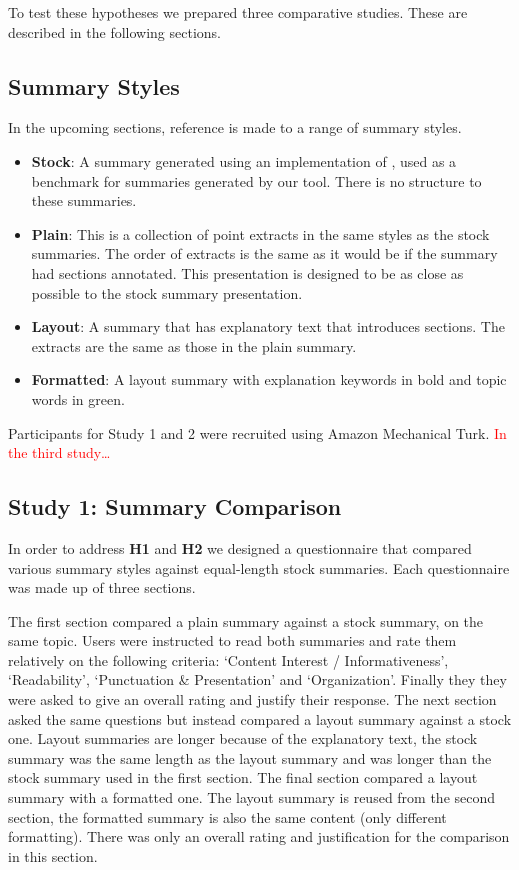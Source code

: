     To test these hypotheses we prepared three comparative studies. These are described in the following sections.

    \tocless\subsection{Summary Styles}
      In the upcoming sections, reference is made to a range of summary styles.
      \begin{itemize}
        \item{\textbf{Stock}: A summary generated using an implementation of \cite{nenkova2006compositional}, used as a benchmark for summaries generated by our tool. There is no structure to these summaries.}
        \item{\textbf{Plain}: This is a collection of point extracts in the same styles as the stock summaries. The order of extracts is the same as it would be if the summary had sections annotated. This presentation is designed to be as close as possible to the stock summary presentation.}
        \item{\textbf{Layout}: A summary that has explanatory text that introduces sections. The extracts are the same as those in the plain summary.}
        \item{\textbf{Formatted}: A layout summary with explanation keywords in bold and topic words in green.}
      \end{itemize}

      Participants for Study 1 and 2 were recruited using Amazon Mechanical Turk. \textcolor{red}{In the third study\dots}

    \tocless\subsection{Study 1: Summary Comparison}
      In order to address \textbf{H1} and \textbf{H2} we designed a questionnaire that compared various summary styles against equal-length stock summaries. Each questionnaire was made up of three sections.

      The first section compared a plain summary against a stock summary, on the same topic. Users were instructed to read both summaries and rate them relatively on the following criteria: `Content Interest / Informativeness', `Readability', `Punctuation \& Presentation' and `Organization'. Finally they they were asked to give an overall rating and justify their response. The next section asked the same questions but instead compared a layout summary against a stock one. Layout summaries are longer because of the explanatory text, the stock summary was the same length as the layout summary and was longer than the stock summary used in the first section. The final section compared a layout summary with a formatted one. The layout summary is reused from the second section, the formatted summary is also the same content (only different formatting). There was only an overall rating and justification for the comparison in this section.

